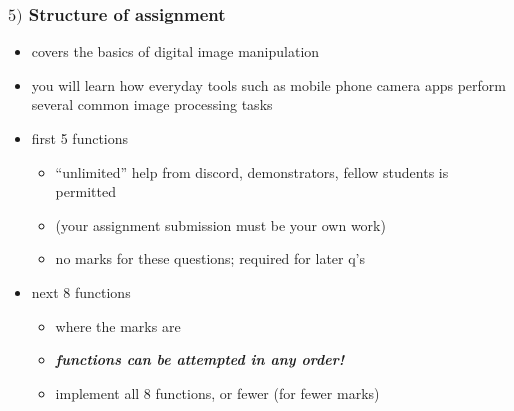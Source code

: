 \documentclass[english,14pt]{beamer}
\begin{document}
\begin{frame}[fragile]

\frametitle{$5)$ Structure of assignment}

\begin{itemize}
	\item covers the basics of digital image manipulation
	\item you will learn how everyday tools such as mobile phone camera apps perform several common image processing tasks
	\item first 5 functions
	\begin{itemize}
		\item ``unlimited'' help from discord, demonstrators, fellow students is permitted
		\item[] (your assignment submission must be your own work)
		\item no marks for these questions; required for later q's
	\end{itemize}
	\item next 8 functions
	\begin{itemize}
		\item where the marks are
		\item \emph{\textbf{functions can be attempted in any order! }}
		\item implement all 8 functions, or fewer (for fewer marks)
	\end{itemize}
\end{itemize}

\end{frame}

\end{document}
